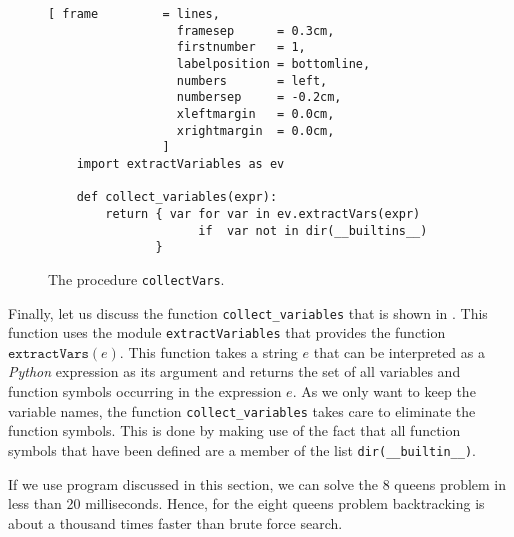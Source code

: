 \begin{figure}[!ht]
\centering
\begin{Verbatim}[ frame         = lines, 
                  framesep      = 0.3cm, 
                  firstnumber   = 1,
                  labelposition = bottomline,
                  numbers       = left,
                  numbersep     = -0.2cm,
                  xleftmargin   = 0.0cm,
                  xrightmargin  = 0.0cm,
                ]
    import extractVariables as ev
    
    def collect_variables(expr):
        return { var for var in ev.extractVars(expr)
                     if  var not in dir(__builtins__)
               }
\end{Verbatim}
\vspace*{-0.3cm}
\caption{The procedure \texttt{collectVars}.}
\label{fig:collect_variables.py}
\end{figure}
Finally, let us discuss the function \texttt{collect\_variables} that is shown in .
This function uses the module \texttt{extractVariables} that provides the function $\texttt{extractVars}(e)$.
This function takes a string $e$ that can be interpreted as a \textsl{Python} expression as its argument and
returns the set of all variables and function symbols occurring in the expression $e$.  As we only want to keep
the variable names, the function \texttt{collect\_variables} takes care to eliminate the function symbols.
This is done by making use of the fact that all function symbols that have been defined are a member of the
list \texttt{dir(\_\_builtin\_\_)}. 

If we use program discussed in this section, we can solve the 8 queens problem in less than 20 milliseconds.
Hence, for the eight queens problem backtracking is about a thousand times faster than brute force search.

